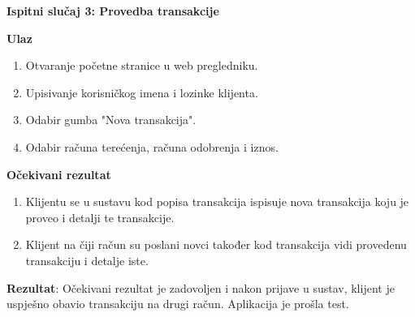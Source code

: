 	\textbf{Ispitni slučaj 3: Provedba transakcije} 
	
	\textbf{Ulaz}
	
	\begin{enumerate}
		
		\item Otvaranje početne stranice u web pregledniku.
		\item Upisivanje korisničkog imena i lozinke klijenta.
		\item Odabir gumba "Nova transakcija".
		\item Odabir računa terećenja, računa odobrenja i iznos.
		
	\end{enumerate}
	
	\textbf{Očekivani rezultat}
	
	\begin{enumerate}
		\item Klijentu se u sustavu kod popisa transakcija ispisuje nova transakcija koju je proveo i detalji te transakcije.
		\item Klijent na čiji račun su poslani novci također kod transakcija vidi provedenu transakciju i detalje iste.
	\end{enumerate}
	
	\textbf{Rezultat}: Očekivani rezultat je zadovoljen i nakon prijave u sustav, klijent je uspješno obavio transakciju na drugi račun. Aplikacija je prošla test.
	
